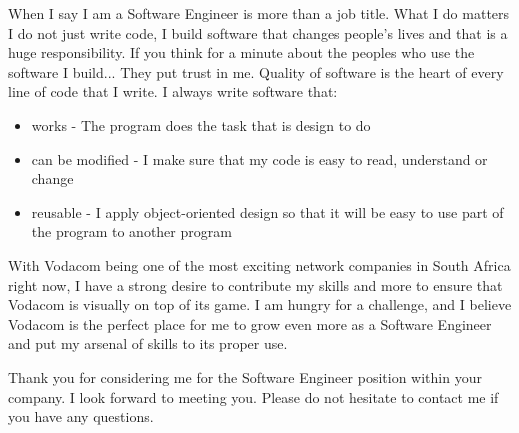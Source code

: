 \documentclass[11pt,a4paper,roman]{moderncv}        %
\begin{document}
When I say I am a Software Engineer is more than a job title. What I do matters
I do not just write code, I build software that changes people's lives and that
is a huge responsibility. If you think for a minute about the peoples who use
the software I build... They put trust in me.
Quality of software is the heart of every line of code that I write. I always
write software that: 
\begin{itemize}
  \item works - The program does the task that is design to do
  \item can be modified - I make sure that my code is easy to read, understand or change
  \item reusable - I apply object-oriented design so that it will be easy to use part of the program to another program 
\end{itemize}

With Vodacom being one of the most exciting network companies in South Africa
right now, I have a strong desire to contribute my skills and more to ensure
that Vodacom is visually on top of its game. I am hungry for a challenge, and I
believe Vodacom is the perfect place for me to grow even more as a Software
Engineer and put my arsenal of skills to its proper use.

Thank you for considering me for the Software Engineer position within your
company. I look forward to meeting you. Please do not hesitate to contact me if
you have any questions.


\makeletterclosing
\end{document}
